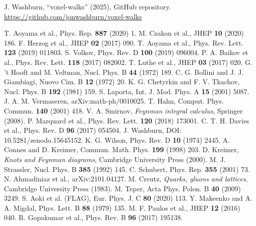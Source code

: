 \documentclass[11pt,a4paper]{article}
\theoremstyle{definition}
\theoremstyle{remark}
\begin{document}
\begin{thebibliography}{99}
 J. Washburn, ``voxel-walks'' (2025), GitHub repository. \url{https://github.com/jonwashburn/voxel-walks}

 T. Aoyama et al., Phys. Rep. \textbf{887} (2020) 1.
 M. Czakon et al., JHEP \textbf{10} (2020) 186.
 F. Herzog et al., JHEP \textbf{02} (2017) 090.
 T. Aoyama et al., Phys. Rev. Lett. \textbf{123} (2019) 011803.
 S. Volkov, Phys. Rev. D \textbf{100} (2019) 096004.
 P. A. Baikov et al., Phys. Rev. Lett. \textbf{118} (2017) 082002.
 T. Luthe et al., JHEP \textbf{03} (2017) 020.
 G. 't Hooft and M. Veltman, Nucl. Phys. B \textbf{44} (1972) 189.
 C. G. Bollini and J. J. Giambiagi, Nuovo Cim. B \textbf{12} (1972) 20.
 K. G. Chetyrkin and F. V. Tkachov, Nucl. Phys. B \textbf{192} (1981) 159.
 S. Laporta, Int. J. Mod. Phys. A \textbf{15} (2001) 5087.
 J. A. M. Vermaseren, arXiv:math-ph/0010025.
 T. Hahn, Comput. Phys. Commun. \textbf{140} (2001) 418.
 V. A. Smirnov, \emph{Feynman integral calculus}, Springer (2008).
 P. Marquard et al., Phys. Rev. Lett. \textbf{120} (2018) 173001.
 C. T. H. Davies et al., Phys. Rev. D \textbf{96} (2017) 054504.
 J. Washburn, DOI: 10.5281/zenodo.15645152.
 K. G. Wilson, Phys. Rev. D \textbf{10} (1974) 2445.
 A. Connes and D. Kreimer, Commun. Math. Phys. \textbf{199} (1998) 203.
 D. Kreimer, \emph{Knots and Feynman diagrams}, Cambridge University Press (2000).
 M. J. Strassler, Nucl. Phys. B \textbf{385} (1992) 145.
 C. Schubert, Phys. Rep. \textbf{355} (2001) 73.
 N. Ahmadiniaz et al., arXiv:2101.04127.
 M. Creutz, \emph{Quarks, gluons and lattices}, Cambridge University Press (1983).
 M. Teper, Acta Phys. Polon. B \textbf{40} (2009) 3249.
 S. Aoki et al. (FLAG), Eur. Phys. J. C \textbf{80} (2020) 113.
 Y. Makeenko and A. A. Migdal, Phys. Lett. B \textbf{88} (1979) 135.
 M. F. Paulos et al., JHEP \textbf{12} (2016) 040.
 R. Gopakumar et al., Phys. Rev. B \textbf{96} (2017) 195138.

\end{thebibliography}
\end{document}

